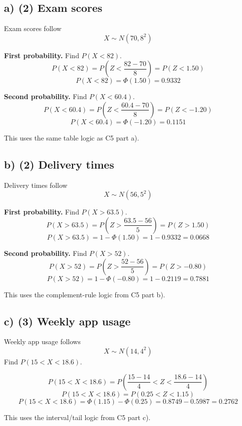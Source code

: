 	\subsection*{a) (2) Exam scores}
	\label{subsec:contextual-normal-distribution-problems-c6-a}
	Exam scores follow
	\[
	X\sim N(70,8^2)
	\]
	
	\textbf{First probability.} Find \(P(X<82)\).
	\[
	P(X<82)=P\left(Z<\frac{82-70}{8}\right)
	=P(Z<1.50)
	\]
	\[
	P(X<82)=\Phi(1.50)=0.9332
	\]
	
	\textbf{Second probability.} Find \(P(X<60.4)\).
	\[
	P(X<60.4)=P\left(Z<\frac{60.4-70}{8}\right)
	=P(Z<-1.20)
	\]
	\[
	P(X<60.4)=\Phi(-1.20)=0.1151
	\]
	
	This uses the same table logic as C5 part a).
	
	
	\subsection*{b) (2) Delivery times}
	\label{subsec:contextual-normal-distribution-problems-c6-b}
	Delivery times follow
	\[
	X\sim N(56,5^2)
	\]
	
	\textbf{First probability.} Find \(P(X>63.5)\).
	\[
	P(X>63.5)=P\left(Z>\frac{63.5-56}{5}\right)
	=P(Z>1.50)
	\]
	\[
	P(X>63.5)=1-\Phi(1.50)=1-0.9332=0.0668
	\]
	
	\textbf{Second probability.} Find \(P(X>52)\).
	\[
	P(X>52)=P\left(Z>\frac{52-56}{5}\right)
	=P(Z>-0.80)
	\]
	\[
	P(X>52)=1-\Phi(-0.80)=1-0.2119=0.7881
	\]
	
	This uses the complement-rule logic from C5 part b).
	
	
	\subsection*{c) (3) Weekly app usage}
	\label{subsec:contextual-normal-distribution-problems-c6-c}
	Weekly app usage follows
	\[
	X\sim N(14,4^2)
	\]
	Find \(P(15<X<18.6)\).
	
	\[
	P(15<X<18.6)
	=
	P\left(\frac{15-14}{4}<Z<\frac{18.6-14}{4}\right)
	\]
	\[
	P(15<X<18.6)=P(0.25<Z<1.15)
	\]
	\[
	P(15<X<18.6)=\Phi(1.15)-\Phi(0.25)
	=0.8749-0.5987
	=0.2762
	\]
	
	This uses the interval/tail logic from C5 part c).
	
